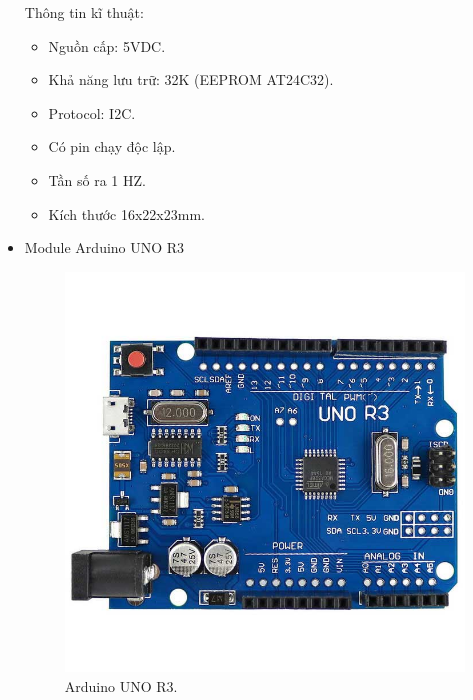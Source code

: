 \documentclass[a4paper,12pt,oneside]{article}
\begin{document}
\begin{itemize}
Thông tin kĩ thuật:
\begin{itemize}
\item Nguồn cấp: 5VDC.
\item Khả năng lưu trữ: 32K (EEPROM AT24C32).
\item Protocol: I2C.
\item Có pin chạy độc lập.
\item Tần số ra 1 HZ.
\item Kích thước 16x22x23mm.
\end{itemize}


\item Module Arduino UNO R3
\begin{center}
\begin{figure}[h!]
\begin{center}
\includegraphics[scale=.3]{hinh/arduino_r3.jpg}
\end{center}
\caption{Arduino UNO R3.}
\end{figure}
\end{center}


\end{itemize}
\end{document}
